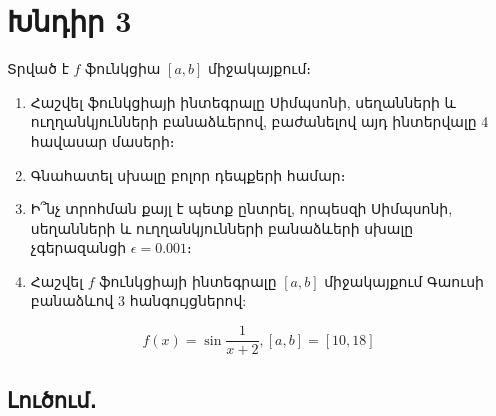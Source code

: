 \documentclass{article}
\begin{document}
\section*{Խնդիր 3}

Տրված է $f$ ֆունկցիա $\left[a, b\right]$ միջակայքում։

\begin{enumerate}

\item

Հաշվել ֆունկցիայի ինտեգրալը Սիմպսոնի, սեղանների և ուղղանկյունների բանաձևերով, բաժանելով այդ ինտերվալը 4 հավասար մասերի։

\item
Գնահատել սխալը բոլոր դեպքերի համար։
	

\item

Ի՞նչ տրոհման քայլ է պետք ընտրել, որպեսզի Սիմպսոնի, սեղանների և ուղղանկյունների բանաձևերի սխալը չգերազանցի $\epsilon = 0.001$։

\item

Հաշվել $f$ ֆունկցիայի ինտեգրալը $\left[a, b\right]$ միջակայքում Գաուսի բանաձևով 3 հանգույցներով:

\end{enumerate}


$$f\left(x\right) = \sin\dfrac{1}{x + 2}, \left[a, b\right] = \left[10, 18\right]$$

\subsection*{Լուծում․}
\end{document}
